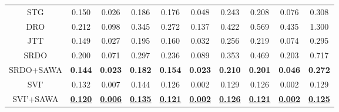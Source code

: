 \begin{table*}[!ht]
{\begin{tabular}{@{}cccccccccc@{}}
\multicolumn{1}{c|}{STG}       & 0.150                & 0.026                & \multicolumn{1}{c|}{0.186}                & 0.176                & 0.048                & \multicolumn{1}{c|}{0.243}                & 0.208                & 0.076                & 0.308                \\
\multicolumn{1}{c|}{DRO}       & 0.212                & 0.098                & \multicolumn{1}{c|}{0.345}                & 0.272                & 0.137                & \multicolumn{1}{c|}{0.422}                & 0.569                & 0.435                & 1.300                \\
\multicolumn{1}{c|}{JTT}       & 0.149                & 0.027                & \multicolumn{1}{c|}{0.195}                & 0.160                & 0.032                & \multicolumn{1}{c|}{0.256}                & 0.219                & 0.074                & 0.295                \\ \midrule
\multicolumn{1}{c|}{SRDO}      & 0.200                & 0.071                & \multicolumn{1}{c|}{0.297}                & 0.236                & 0.089                & \multicolumn{1}{c|}{0.353}                & 0.469                & 0.203                & 0.717                \\
\multicolumn{1}{c|}{SRDO+SAWA} & \textbf{0.144}       & \textbf{0.023}       & \multicolumn{1}{c|}{\textbf{0.182}}       & \textbf{0.154}       & \textbf{0.023}       & \multicolumn{1}{c|}{\textbf{0.210}}       & \textbf{0.201}       & \textbf{0.046}       & \textbf{0.272}       \\ \midrule
\multicolumn{1}{c|}{SVI'}      & 0.132                & 0.007                & \multicolumn{1}{c|}{0.144}                & 0.126                & 0.002                & \multicolumn{1}{c|}{0.129}                & 0.126                & 0.002                & 0.129                \\
\multicolumn{1}{c|}{SVI'+SAWA} & {\ul \textbf{0.120}} & {\ul \textbf{0.006}} & \multicolumn{1}{c|}{{\ul \textbf{0.135}}} & {\ul \textbf{0.121}} & {\ul \textbf{0.002}} & \multicolumn{1}{c|}{{\ul \textbf{0.126}}} & {\ul \textbf{0.121}} & {\ul \textbf{0.002}} & {\ul \textbf{0.125}} \\ \bottomrule
\end{tabular}%
}
\end{table*}





